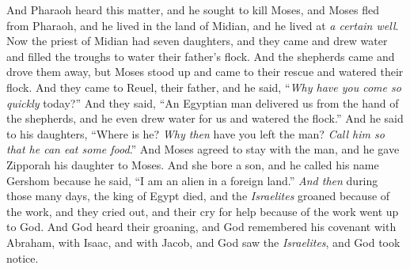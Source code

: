 \begin{biblechapter}
\verse And Pharaoh heard this matter, and he sought to kill Moses, and Moses fled from Pharaoh, and he lived in the land of Midian, and he lived at \textit{a certain well}.
\verse Now the priest of Midian had seven daughters, and they came and drew water and filled the troughs to water their father’s flock.
\verse And the shepherds came and drove them away, but Moses stood up and came to their rescue and watered their flock.
\verse And they came to Reuel, their father, and he said, “\textit{Why have you come so quickly} today?”
\verse And they said, “An Egyptian man delivered us from the hand of the shepherds, and he even drew water for us and watered the flock.”
\verse And he said to his daughters, “Where is he? \textit{Why then} have you left the man? \textit{Call him so that he can eat some food}.”
\verse And Moses agreed to stay with the man, and he gave Zipporah his daughter to Moses.
\verse And she bore a son, and he called his name Gershom because he said, “I am an alien in a foreign land.”
\verse \textit{And then} during those many days, the king of Egypt died, and the \textit{Israelites} groaned because of the work, and they cried out, and their cry for help because of the work went up to God.
\verse And God heard their groaning, and God remembered his covenant with Abraham, with Isaac, and with Jacob,
\verse and God saw the \textit{Israelites}, and God took notice.
\end{biblechapter}

